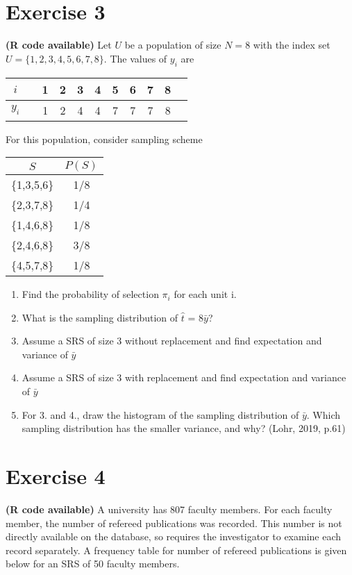 \documentclass[12pt]{article}
\begin{document}
\section*{Exercise 3}
\textbf{\color{ForestGreen}(R code available)} Let  $U$ be a population of size $N=8$ with the index set $U = \{1, 2, 3, 4, 5, 6, 7, 8\}$. The values of $y_i$ are 
\begin{center}
\begin{tabular}{ccccccccccc}
$i$ & \vline & 1 & 2 & 3 & 4 & 5 & 6 & 7 & 8 \\
\hline
$y_i$ & \vline &  1 & 2 & 4 & 4 & 7 & 7 & 7 & 8
\end{tabular}
\end{center}

For this population, consider sampling scheme 
\begin{center}
\begin{tabular}{cc}
$S$ & $P(S)$\\
\hline
\{1,3,5,6\}& 1/8\\
\{2,3,7,8\}& 1/4\\
\{1,4,6,8\} &1/8\\
\{2,4,6,8\} &3/8\\
\{4,5,7,8\} &1/8\\
\end{tabular}
\end{center}

\begin{enumerate}
\item Find the probability of selection $\pi_i$ for each unit i.
\item What is the sampling distribution of $\hat{t}$ = 8$\bar{y}$? 
\item Assume a SRS of size 3 without replacement and find expectation and variance of $\bar{y}$\\
\item Assume a SRS of size 3 with replacement and find expectation and variance of $\bar{y}$\\
\item For 3. and 4., draw the histogram of the sampling distribution of $\bar{y}$. Which sampling distribution has the smaller variance, and why? \hfill (Lohr, 2019, p.61)
\end{enumerate}


\section*{Exercise 4}
\textbf{\color{ForestGreen}(R code available)} A university has 807 faculty members. For each faculty member, the number of refereed publications was recorded. This number is not directly available on the database,
so requires the investigator to examine each record separately. A frequency table for number of refereed publications is given below for an SRS of 50 faculty members.
\end{document}

